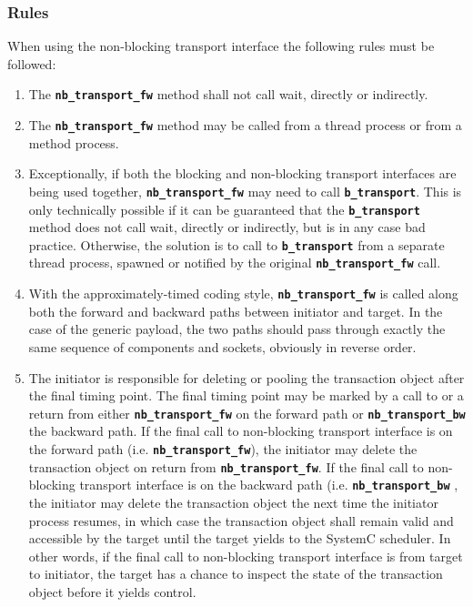 {\subsubsection{Rules}
When using the non-blocking transport interface the following rules must be followed:
\begin{enumerate}
	\item The \texttt{\textbf{nb\_transport\_fw}} method shall not call wait, directly or indirectly.
	\item The \texttt{\textbf{nb\_transport\_fw}} method may be called from a thread process or from a method process.
	\item Exceptionally, if both the blocking and non-blocking transport interfaces are being used together, \texttt{\textbf{nb\_transport\_fw}} may need to call \texttt{\textbf{b\_transport}}. 
	This is only technically possible if it can be guaranteed that
the \texttt{\textbf{b\_transport}} method does not call wait, directly or indirectly, but is in any case bad practice.
	Otherwise, the solution is to call to \texttt{\textbf{b\_transport}} from a separate thread process, spawned or notified by the original \texttt{\textbf{nb\_transport\_fw}} call.
	\item With the approximately-timed coding style, \texttt{\textbf{nb\_transport\_fw}} is called along both the forward and backward paths between initiator and target. 
	In the case of the generic payload, the two paths should pass through exactly the same sequence of components and sockets, obviously in reverse order.
	\item The initiator is responsible for deleting or pooling the transaction object after the final timing point. 
	The final timing point may be marked by a call to or a return from either \texttt{\textbf{nb\_transport\_fw}} on the forward path or \texttt{\textbf{nb\_transport\_bw}} the backward path. 
	If the final call to non-blocking transport interface is on the forward path (i.e. \texttt{\textbf{nb\_transport\_fw}}), the initiator may delete the transaction object on return from \texttt{\textbf{nb\_transport\_fw}}.
	If the final call to non-blocking transport interface is on the backward path (i.e. \texttt{\textbf{nb\_transport\_bw}} , the initiator may delete the transaction object the next time the initiator process resumes, in which case the transaction object shall remain valid and accessible by the target until the target yields to the SystemC scheduler. 
	In other words, if the final call to non-blocking transport interface is from target to initiator, the target has a chance to inspect the state of the transaction object before it yields control. 

\end{enumerate}}
